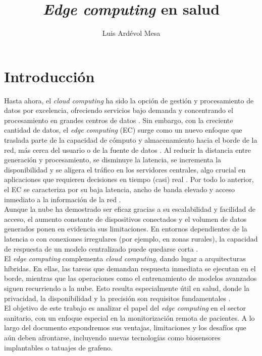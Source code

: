 \documentclass[twoside, 12pt]{opticajnl}
\title{\textit{Edge computing} en salud}
\author[1,2,3]{Luis Ardévol Mesa}
\begin{document}
\maketitle

\begingroup
  \hypersetup{linkcolor=black}
  \tableofcontents
\endgroup

\newpage 
\section{Introducción}

Hasta ahora, el \textit{cloud computing} ha sido la opción de gestión y procesamiento de datos por excelencia, ofreciendo servicios bajo demanda y concentrando el procesamiento en grandes centros de datos . Sin embargo, con la creciente cantidad de datos, el \textit{edge computing} (EC) surge como un nuevo enfoque que traslada parte de la capacidad de cómputo y almacenamiento hacia el borde de la red, más cerca del usuario o de la fuente de datos . Al reducir la distancia entre generación y procesamiento, se disminuye la latencia, se incrementa la disponibilidad y se aligera el tráfico en los servidores centrales, algo crucial en aplicaciones que requieren decisiones en tiempo (casi) real . Por todo lo anterior, el EC se caracteriza por su baja latencia, ancho de banda elevado y acceso inmediato a la información de la red . \\

Aunque la nube ha demostrado ser eficaz gracias a su escalabilidad y facilidad de acceso, el aumento constante de dispositivos conectados y el volumen de datos generados ponen en evidencia sus limitaciones. En entornos dependientes de la latencia o con conexiones irregulares (por ejemplo, en zonas rurales), la capacidad de respuesta de un modelo centralizado puede quedarse corta . \\

El \textit{edge computing} complementa \textit{cloud computing}, dando lugar a arquitecturas híbridas. En ellas, las tareas que demandan respuesta inmediata se ejecutan en el borde, mientras que las operaciones como el entrenamiento de modelos avanzados siguen recurriendo a la nube. Esto resulta especialmente útil en salud, donde la privacidad, la disponibilidad y la precisión son requisitos fundamentales . \\

El objetivo de este trabajo es analizar el papel del \textit{edge computing} en el sector sanitario, con un enfoque especial en la monitorización remota de pacientes. A lo largo del documento expondremos sus ventajas, limitaciones y los desafíos que aún deben afrontarse, incluyendo nuevas tecnologías como biosensores implantables o tatuajes de grafeno.
\end{document}
